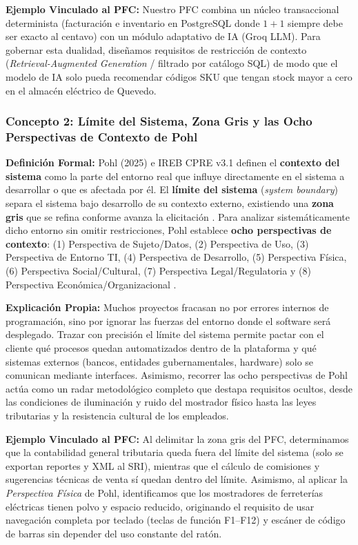 \textbf{Ejemplo Vinculado al PFC:} Nuestro PFC combina un núcleo transaccional determinista (facturación e inventario en PostgreSQL donde $1+1$ siempre debe ser exacto al centavo) con un módulo adaptativo de IA (Groq LLM). Para gobernar esta dualidad, diseñamos requisitos de restricción de contexto (\textit{Retrieval-Augmented Generation} / filtrado por catálogo SQL) de modo que el modelo de IA solo pueda recomendar códigos SKU que tengan stock mayor a cero en el almacén eléctrico de Quevedo.

\subsubsection{Concepto 2: Límite del Sistema, Zona Gris y las Ocho Perspectivas de Contexto de Pohl}
\textbf{Definición Formal:} Pohl (2025) \cite{pohl2025} e IREB CPRE v3.1 \cite{ireb2023} definen el \textbf{contexto del sistema} como la parte del entorno real que influye directamente en el sistema a desarrollar o que es afectada por él. El \textbf{límite del sistema} (\textit{system boundary}) separa el sistema bajo desarrollo de su contexto externo, existiendo una \textbf{zona gris} que se refina conforme avanza la elicitación \cite{pohl2025}. Para analizar sistemáticamente dicho entorno sin omitir restricciones, Pohl establece \textbf{ocho perspectivas de contexto}: (1) Perspectiva de Sujeto/Datos, (2) Perspectiva de Uso, (3) Perspectiva de Entorno TI, (4) Perspectiva de Desarrollo, (5) Perspectiva Física, (6) Perspectiva Social/Cultural, (7) Perspectiva Legal/Regulatoria y (8) Perspectiva Económica/Organizacional \cite{pohl2025}.

\textbf{Explicación Propia:} Muchos proyectos fracasan no por errores internos de programación, sino por ignorar las fuerzas del entorno donde el software será desplegado. Trazar con precisión el límite del sistema permite pactar con el cliente qué procesos quedan automatizados dentro de la plataforma y qué sistemas externos (bancos, entidades gubernamentales, hardware) solo se comunican mediante interfaces. Asimismo, recorrer las ocho perspectivas de Pohl actúa como un radar metodológico completo que destapa requisitos ocultos, desde las condiciones de iluminación y ruido del mostrador físico hasta las leyes tributarias y la resistencia cultural de los empleados.

\textbf{Ejemplo Vinculado al PFC:} Al delimitar la zona gris del PFC, determinamos que la contabilidad general tributaria queda fuera del límite del sistema (solo se exportan reportes y XML al SRI), mientras que el cálculo de comisiones y sugerencias técnicas de venta sí quedan dentro del límite. Asimismo, al aplicar la \textit{Perspectiva Física} de Pohl, identificamos que los mostradores de ferreterías eléctricas tienen polvo y espacio reducido, originando el requisito de usar navegación completa por teclado (teclas de función F1--F12) y escáner de código de barras sin depender del uso constante del ratón.

